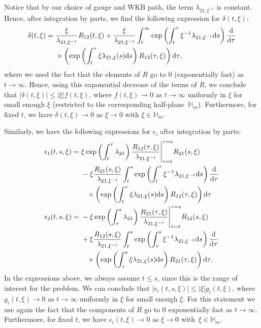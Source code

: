 Notice that by our choice of gauge and WKB path, the term $\lambda_{21,\xi^{-1}}$ is constant. Hence, after integration by parts, we find the following expression for $\delta(t,\xi)$:
\begin{align}
 \delta(t,\xi)={}&\frac{\xi}{{\lambda}_{21,\xi^{-1}}}R_{12}(t,\xi)+ \frac{\xi}{\lambda_{21,\xi^{-1}}} \int_{t}^{\infty}\exp \left(\int_{t}^{\tau}\xi^{-1}\lambda_{21,\xi^{-1}}{\rm d}s\right)\frac{{\rm d}}{{\rm d}\tau} \nonumber\\
 &\times\left(\exp \left(\int_{t}^{\tau}\xi\lambda_{21,\xi}(s){\rm d}s\right)R_{12}(\tau,\xi)\right){\rm d}\tau,\label{est1}
\end{align}
where we used the fact that the elements of $R$ go to $0$ (exponentially fast) as $t\to \infty$.
Hence, using this exponential decrease of the terms of $R$, we conclude that $|\delta(t,\xi)|\leq |\xi|f(t,\xi)$, where $f(t,\xi) \to 0$ as $t \to \infty$ uniformly in $\xi$ for small enough $\xi$ (restricted to the corresponding half-plane~$\mathbb{H}_m$). Furthermore, for fixed $t$, we have $\delta(t,\xi)\to 0$ as $\xi \to 0$ with $\xi \in \mathbb{H}_m$.

Similarly, we have the following expressions for $\epsilon_i$ after integration by parts:
\begin{align}
 \epsilon_1(t,s,\xi)={}& \xi \exp \left(\int_{t}^{\tau}\lambda_{21}\right)\frac{R_{12}(\tau,\xi)}{\lambda_{21,\xi^{-1}}}\Bigg|_{\tau=t}^{\tau=s}R_{21}(s,\xi)\nonumber\\
 &- \xi \frac{R_{21}(s,\xi)}{\lambda_{21,\xi^{-1}}} \int_{t}^{s}\exp \left(\int_{t}^{\tau}\xi^{-1}\lambda_{21,\xi^{-1}}{\rm d}s\right)\frac{{\rm d}}{{\rm d}\tau}\nonumber\\
 &\phantom{- }{}\times\left(\exp \left(\int_{t}^{\tau}\xi\lambda_{21,\xi}(s){\rm d}s\right)R_{12}(\tau,\xi)\right){\rm d}\tau\nonumber\\
 \epsilon_2(t,s,\xi)={}& -\xi \exp \left(\int_{\tau}^{s}\lambda_{21}\right)\frac{R_{21}(\tau,\xi)}{\lambda_{21,\xi^{-1}}}\Bigg|_{\tau=t}^{\tau=s}R_{12}(s,\xi)\nonumber\\
 &+ \xi \frac{R_{12}(s,\xi) }{\lambda_{21,\xi^{-1}}}\int_{t}^{s}\exp \left(\int_{\tau}^{s}\xi^{-1}\lambda_{21,\xi^{-1}}{\rm d}s\right)\frac{{\rm d}}{{\rm d}\tau}\nonumber\\
 &\phantom{+ }{}\times\left(\exp \left(\int_{\tau}^{s}\xi\lambda_{21,\xi}(s){\rm d}s\right)R_{21}(\tau,\xi)\right){\rm d}\tau.\label{est2}
\end{align}
In the expressions above, we always assume $t\leq s$, since this is the range of interest for the problem. We can conclude that $|\epsilon_i(t,s,\xi)|\leq |\xi|g_i(t,\xi)$, where $g_i(t,\xi)\to 0$ as $t \to \infty$ uniformly in $\xi$ for small enough $\xi$. For this statement we use again the fact that the components of $R$ go to $0$ exponentially fast as $t \to \infty$. Furthermore, for fixed $t$, we have $\epsilon_i(t,\xi)\to 0$ as $\xi \to 0$ with~${\xi \in \mathbb{H}_m}$.

